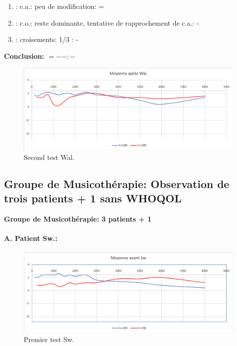 	\begin{enumerate}

 		\item : c.a.: peu de modification: =

 		\item : c.o.: reste dominante, tentative de rapprochement de c.a.: -
 		\item : croisements: 1/3 :  -

                \end{enumerate}

                \textbf{ Conclusion:  $= -  -        : -$ }

               \begin{figure}
\centering
\includegraphics[width=0.7\linewidth]{images/graphiques/wal_post.png}
\caption[Moyenne OG+OD]{Second test Wal.}

\label{groupecontroleimage1}
\end{figure}
\subsection{Groupe de Musicothérapie: Observation de trois patients + 1 sans WHOQOL}
  \textbf{Groupe de Musicothérapie: 3 patients + 1}

\paragraph{ A. Patient Sw.:}



 \begin{figure}[th]
\centering
\includegraphics[width=0.7\linewidth]{images/graphiques/sw_pre.png}
\caption[Moyenne OG+OD]{Premier test Sw.}

\end{figure}

